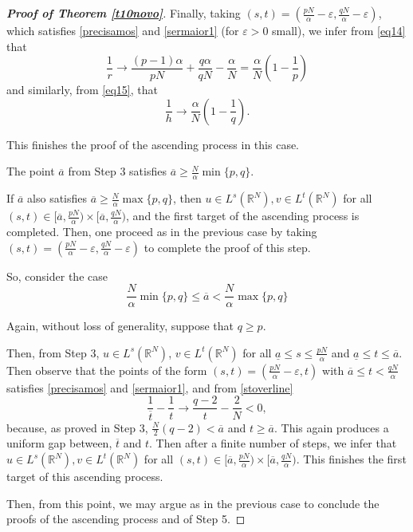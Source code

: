 \documentclass[12pt,a4paper]{article}
\numberwithin{equation}{section}
\begin{document}
\begin{proof}[\bf{Proof of Theorem \ref{t10novo}}]
Finally, taking $(s,t) = (\frac{pN}{\alpha} - \varepsilon, \frac{qN}{\alpha} - \varepsilon)$, which satisfies \eqref{precisamos} and \eqref{sermaior1} (for $\varepsilon>0$ small), we infer from \eqref{eq14} that
\[
\dfrac{1}{r} \to \dfrac{(p-1)\alpha}{pN} + \dfrac{q\alpha}{qN} - \dfrac{\alpha}{N} = \dfrac{\alpha}{N}\left( 1 - \dfrac{1}{p}\right)
\]
and similarly, from \eqref{eq15}, that
\[
\dfrac{1}{h} \to \dfrac{\alpha}{N}\left( 1 - \dfrac{1}{q}\right).
\]

This finishes the proof of the ascending process in this case.
\medbreak

 The point $\overline{a}$ from Step 3 satisfies $\overline{a} \geq \frac{N}{\alpha} \min\{p,q\}$.

If $\overline{a}$ also satisfies $\overline{a} \geq \frac{N}{\alpha} \max\{p,q\}$, then $u \in L^s(\mathbb{R}^N), v \in L^t(\mathbb{R}^N)$ for all $(s,t) \in [\overline{a}, \frac{pN}{\alpha}) \times [\overline{a}, \frac{qN}{\alpha})$, and the first target of the ascending process is completed. Then, one proceed as in the previous case by taking $(s,t) = (\frac{pN}{\alpha} - \varepsilon, \frac{qN}{\alpha} - \varepsilon)$ to complete the proof of this step.

So, consider the case
\[
\dfrac{N}{\alpha} \min\{p,q\} \leq \overline{a} <\dfrac{N}{\alpha} \max\{p,q\}
\]

Again, without loss of generality, suppose that $q\geq p$. 


Then, from Step 3, $u \in L^s(\mathbb{R}^N)$, $v \in L^t(\mathbb{R}^N)$ for all $\underline{a} \leq s \leq \frac{pN}{\alpha}$ and $\underline{a} \leq t \leq \overline{a}$. Then observe that the points of the form $(s,t) = (\frac{pN}{\alpha}- \varepsilon, t)$ with $\overline{a} \leq t < \frac{qN}{\alpha}$ satisfies \eqref{precisamos} and \eqref{sermaior1}, and from \eqref{stoverline}
\[
\dfrac{1}{\overline{t}} - \dfrac{1}{t} \to \frac{q-2}{t} - \frac{2}{N} < 0,
\]
because, as proved in Step 3, $\frac{N}{2}(q-2)< \overline{a}$ and $t\geq \overline{a}$.  This again produces a uniform gap between, $\overline{t}$ and $t$. Then after a finite number of steps, we infer that $u \in L^s(\mathbb{R}^N), v \in L^t(\mathbb{R}^N)$ for all $(s,t) \in [\overline{a}, \frac{pN}{\alpha}) \times [\overline{a}, \frac{qN}{\alpha})$. This finishes the first target of this ascending process. 


Then, from this point, we may argue as in the previous case to conclude the proofs of the ascending process and of Step 5.







\end{proof}
\end{document}
